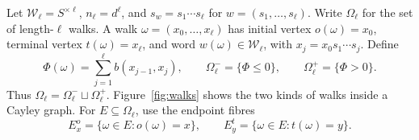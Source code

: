 \documentclass[a4paper,11pt]{amsproc}
\numberwithin{equation}{section}
\theoremstyle{definition}
\newcommand{\cW}{\mathcal W}
\begin{document}
Let $\cW_\ell=S^{\times\ell}$, $n_\ell=d^\ell$, and $s_w=s_1\cdots s_\ell$ for $w=(s_1,\ldots,s_\ell)$. Write $\Omega_\ell$ for the set of length-$\ell$ walks. A walk $\omega=(x_0,\ldots,x_\ell)$ has initial vertex $o(\omega)=x_0$, terminal vertex $t(\omega)=x_\ell$, and word $w(\omega)\in\cW_\ell$, with $x_j=x_0s_1\cdots s_j$. Define
\begin{equation}\label{eq:walk-signs}
 \Phi(\omega)=\sum_{j=1}^{\ell}b(x_{j-1},x_j),\qquad
 \Omega_\ell^- =\{\Phi\le0\},\qquad
 \Omega_\ell^+ =\{\Phi>0\}.
\end{equation}
Thus $\Omega_\ell=\Omega_\ell^-\sqcup\Omega_\ell^+$. Figure~\ref{fig:walks} shows the two kinds of walks inside a Cayley graph. For $E\subseteq\Omega_\ell$, use the endpoint fibres
\[
 E_x^o=\{\omega\in E:o(\omega)=x\},\qquad
 E_y^t=\{\omega\in E:t(\omega)=y\}.
\]
\end{document}
